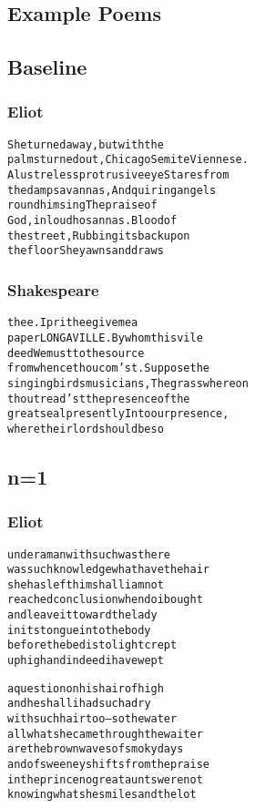 \documentclass[10pt,twocolumn]{article}
\begin{document}
\begin{appendices}
\section{Example Poems}
\subsection{Baseline}
\subsubsection{Eliot}
\begin{alltt}
She turned away, but with the
palms turned out, Chicago Semite Viennese.
A lustreless protrusive eye Stares from
the damp savannas, And quiring angels
round him sing The praise of
God, in loud hosannas. Blood of
the street, Rubbing its back upon
the floor She yawns and draws
\end{alltt}

\subsubsection{Shakespeare}

\begin{alltt}
thee. I prithee give me a
paper LONGAVILLE. By whom this vile
deed We must to the source
from whence thou com'st. Suppose the
singing birds musicians, The grass whereon
thou tread'st the presence of the
great seal presently Into our presence,
where their lord should be so
\end{alltt}

\subsection{n=1}
\subsubsection{Eliot}
\begin{alltt}
under a man with such was there
was such knowledge what have the hair
she has left him shall i am not
reached conclusion when do i bought
and leave it toward the lady
in its tongue into the body
before the bed is to light crept
up high and indeed i have wept
\end{alltt}

\begin{alltt}
a question on his hair of high
and he shall i had such a dry
with such hair too--so the water
all what she came through the waiter
are the brown waves of smoky days
and of sweeney shifts from the praise
in the prince no great aunts were not
knowing what she smiles and the lot
\end{alltt}


\end{appendices}
\end{document}
